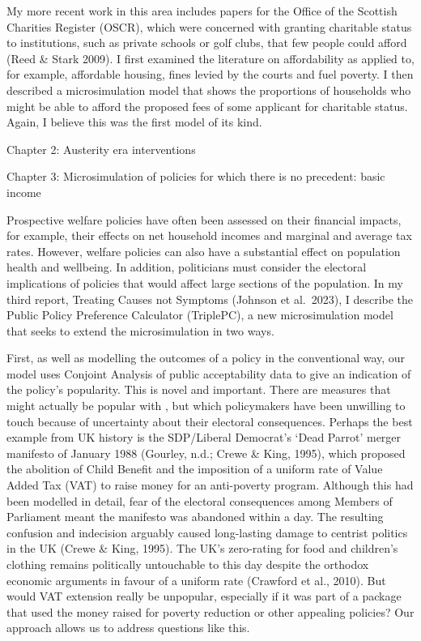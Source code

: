 \documentclass[
  letterpaper,
  DIV=11,
  numbers=noendperiod]{scrartcl}
\begin{document}
My more recent work in this area includes papers for the Office of the
Scottish Charities Register (OSCR), which were concerned with granting
charitable status to institutions, such as private schools or golf
clubs, that few people could afford (Reed \& Stark 2009). I first
examined the literature on affordability as applied to, for example,
affordable housing, fines levied by the courts and fuel poverty. I then
described a microsimulation model that shows the proportions of
households who might be able to afford the proposed fees of some
applicant for charitable status. Again, I believe this was the first
model of its kind.

Chapter 2: Austerity era interventions

Chapter 3: Microsimulation of policies for which there is no precedent:
basic income

Prospective welfare policies have often been assessed on their financial
impacts, for example, their effects on net household incomes and
marginal and average tax rates. However, welfare policies can also have
a substantial effect on population health and wellbeing. In addition,
politicians must consider the electoral implications of policies that
would affect large sections of the population. In my third report,
Treating Causes not Symptoms (Johnson et al.~2023), I describe the
Public Policy Preference Calculator (TriplePC), a new microsimulation
model that seeks to extend the microsimulation in two ways.

First, as well as modelling the outcomes of a policy in the conventional
way, our model uses Conjoint Analysis of public acceptability data to
give an indication of the policy's popularity. This is novel and
important. There are measures that might actually be popular with , but
which policymakers have been unwilling to touch because of uncertainty
about their electoral consequences. Perhaps the best example from UK
history is the SDP/Liberal Democrat's `Dead Parrot' merger manifesto of
January 1988 (Gourley, n.d.; Crewe \& King, 1995), which proposed the
abolition of Child Benefit and the imposition of a uniform rate of Value
Added Tax (VAT) to raise money for an anti-poverty program. Although
this had been modelled in detail, fear of the electoral consequences
among Members of Parliament meant the manifesto was abandoned within a
day. The resulting confusion and indecision arguably caused long-lasting
damage to centrist politics in the UK (Crewe \& King, 1995). The UK's
zero-rating for food and children's clothing remains politically
untouchable to this day despite the orthodox economic arguments in
favour of a uniform rate (Crawford et al., 2010). But would VAT
extension really be unpopular, especially if it was part of a package
that used the money raised for poverty reduction or other appealing
policies? Our approach allows us to address questions like this.
\end{document}

